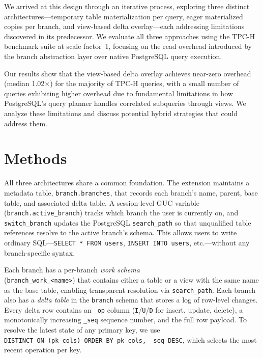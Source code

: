\documentclass[sigplan, nonacm]{acmart}
\begin{document}
We arrived at this design through an iterative process, exploring three distinct architectures---temporary table materialization per query, eager materialized copies per branch, and view-based delta overlay---each addressing limitations discovered in its predecessor. We evaluate all three approaches using the TPC-H benchmark suite at scale factor~1, focusing on the read overhead introduced by the branch abstraction layer over native PostgreSQL query execution.

Our results show that the view-based delta overlay achieves near-zero overhead (median 1.02$\times$) for the majority of TPC-H queries, with a small number of queries exhibiting higher overhead due to fundamental limitations in how PostgreSQL's query planner handles correlated subqueries through views. We analyze these limitations and discuss potential hybrid strategies that could address them.

\section{Methods}

All three architectures share a common foundation. The extension maintains a metadata table, \texttt{branch.branches}, that records each branch's name, parent, base table, and associated delta table. A session-level GUC variable \\ (\texttt{branch.active\_branch}) tracks which branch the user is currently on, and \texttt{switch\_branch} updates the PostgreSQL \texttt{search\_path} so that unqualified table references resolve to the active branch's schema. This allows users to write ordinary SQL---\texttt{SELECT~*~FROM~users}, \texttt{INSERT~INTO~users}, etc.---without any branch-specific syntax.

Each branch has a per-branch \emph{work schema} \\ (\texttt{branch\_work\_<name>}) that contains either a table or a view with the same name as the base table, enabling transparent resolution via \texttt{search\_path}. Each branch also has a \emph{delta table} in the \texttt{branch} schema that stores a log of row-level changes. Every delta row contains an \texttt{\_op} column (\texttt{I}/\texttt{U}/\texttt{D} for insert, update, delete), a monotonically increasing \texttt{\_seq} sequence number, and the full row payload. To resolve the latest state of any primary key, we use \\\texttt{DISTINCT~ON~(pk\_cols)~ORDER~BY~pk\_cols,~\_seq~DESC}, which selects the most recent operation per key.
\end{document}
